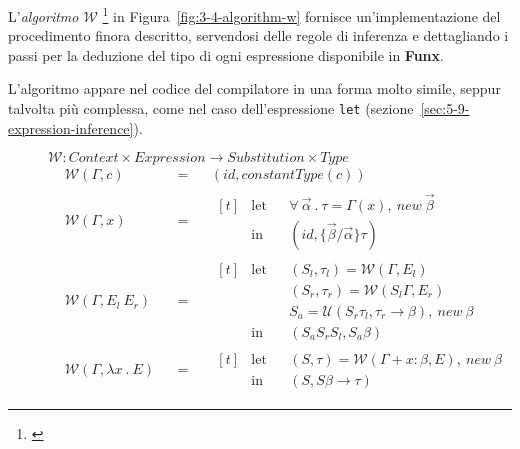 \noindent L'\textit{algoritmo $\mathcal{W}$}%
\footnote{ \cite{Lee-1998-FolkloreInference}}
in Figura~\ref{fig:3-4-algorithm-w} fornisce un'implementazione del procedimento finora descritto,
servendosi delle regole di inferenza e dettagliando i passi per la deduzione del tipo di ogni espressione disponibile in \textbf{Funx}.

\noindent L'algoritmo appare nel codice del compilatore in una forma molto simile, seppur talvolta più complessa,
come nel caso dell'espressione \texttt{let} (sezione~\ref{sec:5-9-expression-inference}).

\newpage

\begin{figure}
    $\mathcal{W} : Context \times Expression \rightarrow Substitution \times Type$
    \newcommand{\algW}[2]{\mathcal{W}(#1, #2)}
    \newcommand{\algWline}[2]{& \algW{#1}{#2} & & = & &}
    \[
        \begin{aligned}
            \algWline{\Gamma}{c} (id, constantType(c))
            \\
            \algWline{\Gamma}{x}
            \begin{aligned}[t]
                 & \text{let} &  & \forall\ \vec{\alpha}\ .\ \tau = \Gamma(x),\ new\ \vec{\beta} \\
                 & \text{in}  &  & (id, \{\vec{\beta} / \vec{\alpha}\} \tau)
            \end{aligned}
            \\
            \algWline{\Gamma}{E_l\ E_r}
            \begin{aligned}[t]
                 & \text{let} &  & (S_l, \tau_l) = \algW{\Gamma}{E_l}                                   \\
                 &            &  & (S_r, \tau_r) = \algW{S_l\Gamma}{E_r}                                \\
                 &            &  & S_a = \mathcal{U}(S_r \tau_l, \tau_r \rightarrow \beta),\ new\ \beta \\
                 & \text{in}  &  & (S_a S_r S_l, S_a \beta)
            \end{aligned}
            \\
            \algWline{\Gamma}{\lambda x\ .\ E}
            \begin{aligned}[t]
                 & \text{let} &  & (S, \tau) = \algW{\Gamma + x : \beta}{E},\ new\ \beta \\
                 & \text{in}  &  & (S, S \beta \rightarrow \tau)

\end{aligned}
\end{aligned}\]
\end{figure}
